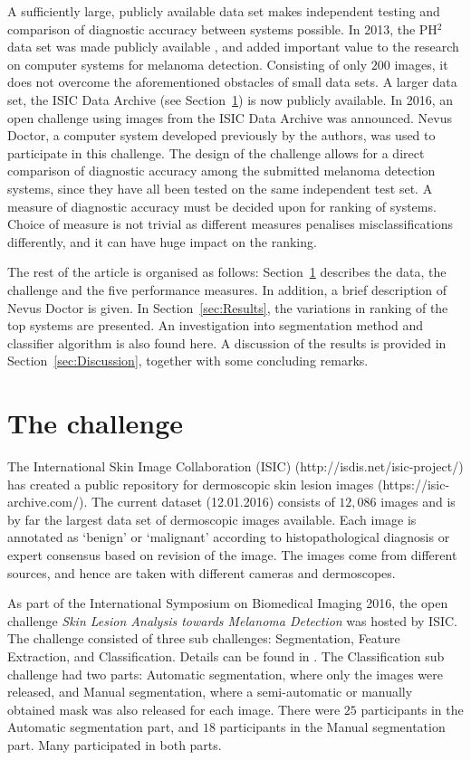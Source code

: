 \documentclass[a4paper,12pt]{article}
\begin{document}
A sufficiently large, publicly available data set makes independent testing and comparison of diagnostic accuracy between systems possible. 
In 2013, the PH$^2$ data set was made publicly available \citep{Mendonca2013PH2}, and added important value to the research on computer systems for melanoma detection. 
Consisting of only $200$ images, it does not overcome the aforementioned obstacles of small data sets. 
A larger data set, the ISIC Data Archive (see Section~\ref{sec:Challenge}) is now publicly available. 
In 2016, an open challenge using images from the ISIC Data Archive was announced. 
Nevus Doctor, a computer system developed previously by the authors, was used to participate in this challenge.
The design of the challenge allows for a direct comparison of diagnostic accuracy among the submitted melanoma detection systems, since they have all been tested on the same independent test set. 
A measure of diagnostic accuracy must be decided upon for ranking of systems. 
Choice of measure is not trivial as different measures penalises misclassifications differently, and it can have huge impact on the ranking. 

The rest of the article is organised as follows: Section~\ref{sec:Challenge} describes the data, the challenge and the five performance measures. In addition, a brief description of Nevus Doctor is given. In Section~\ref{sec:Results}, the variations in ranking of the top systems are presented. An investigation into segmentation method and classifier algorithm is also found here. A discussion of the results is provided in Section~\ref{sec:Discussion}, together with some concluding remarks. 

\section{The challenge} \label{sec:Challenge}

The International Skin Image Collaboration (ISIC) (http://isdis.net/isic-project/) has created a public repository for dermoscopic skin lesion images (https://isic-archive.com/). 
The current dataset (12.01.2016) consists of $12,086$ images and is by far the largest data set of dermoscopic images available. 
Each image is annotated as `benign' or `malignant' according to histopathological diagnosis or expert consensus based on revision of the image. 
The images come from different sources, and hence are taken with different cameras and dermoscopes. 

As part of the International Symposium on Biomedical Imaging 2016, the open challenge {\it Skin Lesion Analysis towards Melanoma Detection} was hosted by ISIC. 
The challenge consisted of three sub challenges: Segmentation, Feature Extraction, and Classification. 
Details can be found in \cite{Gutman2016Skin}. 
The Classification sub challenge had two parts: Automatic segmentation, where only the images were released, and Manual segmentation, where a semi-automatic or manually obtained mask was also released for each image. 
There were $25$ participants in the Automatic segmentation part, and $18$ participants in the Manual segmentation part. 
Many participated in both parts. 
\end{document}
